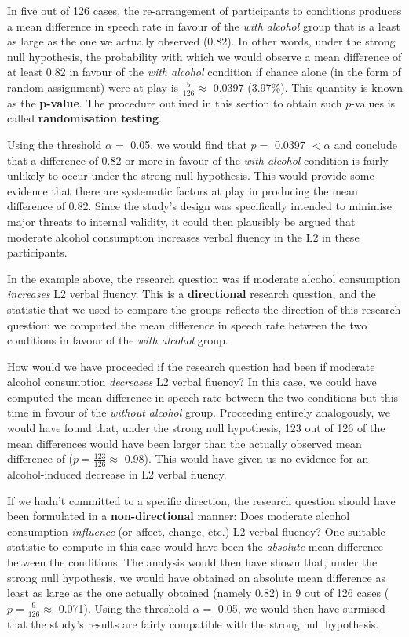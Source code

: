 \documentclass[a4paper]{tufte-book}\usepackage[]{graphicx}\usepackage[]{xcolor}
\newcommand{\term}[1]{\textbf{#1}}
\begin{document}
In five out of 126 cases, the re-arrangement of participants to conditions
produces a mean difference in speech rate in favour of the \textit{with alcohol}
group that is a least as large as the one we actually observed (0.82).
In other words, under the strong null hypothesis,
the probability with which we would observe a mean difference of at least 0.82 
in favour of the \textit{with alcohol} condition if chance alone (in the form
of random assignment) were at play is $\frac{5}{126} \approx$ 0.0397 (3.97\%).
This quantity is known as the \term{p-value}.
The procedure outlined in this section to obtain such $p$-values
is called \term{randomisation testing}.

Using the threshold $\alpha =$ 0.05,
we would find that $p = $ 0.0397 $< \alpha$ and conclude
that a difference of 0.82 or more in favour of the \textit{with alcohol} condition
is fairly unlikely to occur under the strong null hypothesis.
This would provide some evidence that there are systematic factors at play
in producing the mean difference of 0.82.
Since the study's design was specifically intended to minimise major threats to 
internal validity, it could then plausibly be argued
that moderate alcohol consumption increases verbal fluency 
in the L2 in these participants.

\label{rem:directional}
  In the example above, 
  the research question was if moderate alcohol consumption \emph{increases}
  L2 verbal fluency.
  This is a \term{directional} research question,
  and the statistic that we used to compare the groups reflects the direction
  of this research question:
  we computed the mean difference in speech rate between the two conditions
  in favour of the \textit{with alcohol} group.
  
  How would we have proceeded if the research question had been if 
  moderate alcohol consumption \emph{decreases} L2 verbal fluency?
  In this case, we could have computed the mean difference in speech
  rate between the two conditions but this time in favour of the
  \textit{without alcohol} group.
  Proceeding entirely analogously, we would have found that, under the
  strong null hypothesis, 123 out of 126 of the mean differences
  would have been larger than the actually observed mean difference of
   ($p = \frac{123}{126} \approx$ 0.98).
  This would have given us no evidence for an alcohol-induced decrease
  in L2 verbal fluency.
  
  If we hadn't committed to a specific direction, the research question
  should have been formulated in a \term{non-directional} manner:
  Does moderate alcohol consumption \emph{influence} (or affect, change, etc.)
  L2 verbal fluency?
  One suitable statistic to compute in this case would have been
  the \emph{absolute} mean difference between the conditions.
  The analysis would then have shown that, under the strong null hypothesis,
  we would have obtained an absolute mean difference as least as large
  as the one actually obtained (namely 0.82) in 9 out of 126 cases
  ($p = \frac{9}{126} \approx$ 0.071).
  Using the threshold $\alpha =$ 0.05, we would then have surmised that
  the study's results are fairly compatible with the strong null hypothesis.
  
\end{document}
